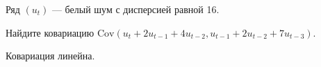 
\begin{question}
Ряд \((u_t)\) --- белый шум с дисперсией равной 16.

Найдите ковариацию \(\mathrm{Cov}(u_t + 2 u_{t-1} + 4u_{t-2}, u_{t-1} + 2u_{t-2} + 7u_{t-3})\).
\end{question}

\begin{solution}
Ковариация линейна.
\end{solution}

